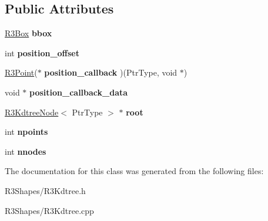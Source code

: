 \subsection*{Public Attributes}
\begin{DoxyCompactItemize}
\item 
\hyperlink{class_r3_box}{R3\+Box} {\bfseries bbox}\hypertarget{class_r3_kdtree_a5e1e3d8113e4b4e3f8bf558c43bda5d2}{}\label{class_r3_kdtree_a5e1e3d8113e4b4e3f8bf558c43bda5d2}

\item 
int {\bfseries position\+\_\+offset}\hypertarget{class_r3_kdtree_acb3e370d99b1d054d1d260c12f443a37}{}\label{class_r3_kdtree_acb3e370d99b1d054d1d260c12f443a37}

\item 
\hyperlink{class_r3_point}{R3\+Point}($\ast$ {\bfseries position\+\_\+callback} )(Ptr\+Type, void $\ast$)\hypertarget{class_r3_kdtree_a6544a888fb5708924597c7f722f462b7}{}\label{class_r3_kdtree_a6544a888fb5708924597c7f722f462b7}

\item 
void $\ast$ {\bfseries position\+\_\+callback\+\_\+data}\hypertarget{class_r3_kdtree_afd98560c6d6e0c9738dc0999fba03137}{}\label{class_r3_kdtree_afd98560c6d6e0c9738dc0999fba03137}

\item 
\hyperlink{class_r3_kdtree_node}{R3\+Kdtree\+Node}$<$ Ptr\+Type $>$ $\ast$ {\bfseries root}\hypertarget{class_r3_kdtree_a6c798271d6d168b8a93d1763e40e2695}{}\label{class_r3_kdtree_a6c798271d6d168b8a93d1763e40e2695}

\item 
int {\bfseries npoints}\hypertarget{class_r3_kdtree_a6421964dbaa0b3631bdc74aec03d2285}{}\label{class_r3_kdtree_a6421964dbaa0b3631bdc74aec03d2285}

\item 
int {\bfseries nnodes}\hypertarget{class_r3_kdtree_a77d9f807d31d66d645471e71258471f0}{}\label{class_r3_kdtree_a77d9f807d31d66d645471e71258471f0}

\end{DoxyCompactItemize}


The documentation for this class was generated from the following files\+:\begin{DoxyCompactItemize}
\item 
R3\+Shapes/R3\+Kdtree.\+h\item 
R3\+Shapes/R3\+Kdtree.\+cpp\end{DoxyCompactItemize}
